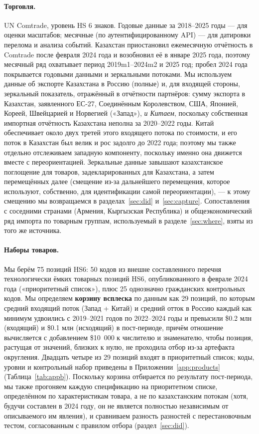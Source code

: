 \documentclass[12pt]{article}
\begin{document}
\paragraph{Торговля.} UN Comtrade, уровень HS 6 знаков. Годовые данные за 2018--2025 годы —
для оценки масштабов; месячные (по аутентифицированному API) — для датировки перелома и
анализа событий. Казахстан приостановил ежемесячную отчётность в Comtrade после февраля
2024 года и возобновил её в январе 2025 года, поэтому месячный ряд охватывает период
2019m1--2024m2 и 2025 год; пробел 2024 года покрывается годовыми данными и зеркальными
потоками. Мы используем данные об экспорте Казахстана в Россию (полные) и, для входящей
стороны, зеркальный показатель, отражённый в отчётности партнёров: сумму экспорта в
Казахстан, заявленного ЕС-27, Соединённым Королевством, США, Японией, Кореей, Швейцарией и
Норвегией («Запад»), \emph{и Китаем}, поскольку собственная импортная отчётность Казахстана
неполна за 2020--2022 годы. Китай обеспечивает около двух третей этого входящего потока по
стоимости, и его поток в Казахстан был велик и рос задолго до 2022 года; поэтому мы также
отдельно отслеживаем западную компоненту, поскольку именно она движется вместе с
переориентацией. Зеркальные данные завышают казахстанское поглощение для товаров,
задекларированных для Казахстана, а затем перемещённых далее (смещение из-за дальнейшего
перемещения, которое \citet{chupilkin2026roundabout} используют, собственно, для
идентификации самой переориентации), — к этому смещению мы возвращаемся в
разделах~\ref{sec:did} и~\ref{sec:capture}. Сопоставления с соседними странами (Армения,
Кыргызская Республика) и общеэкономический ряд импорта по товарным группам, используемый в
разделе~\ref{sec:where}, взяты из того же источника.

\paragraph{Наборы товаров.} Мы берём 75 позиций HS6: 50 кодов из внешне составленного
перечня технологически ёмких товарных позиций HS6, опубликованного в феврале 2024 года
(«приоритетный список»), плюс 25 однозначно гражданских контрольных кодов. Мы определяем
\textbf{корзину всплеска} по данным как 29 позиций, по которым средний входящий поток
(Запад + Китай) и средний отток в Россию каждый как минимум удвоились с 2019--2021 годов по
2022--2024 годы и превысили \$0.2 млн (входящий) и \$0.1 млн (исходящий) в пост-периоде,
причём отношение вычисляется с добавлением \$10~000 к числителю и знаменателю, чтобы
позиция, растущая от значений, близких к нулю, не проходила отбор из-за артефакта
округления. Двадцать четыре из 29 позиций входят в приоритетный список; коды, уровни и
контрольный набор приведены в Приложении~\ref{app:products} (Таблица~\ref{tab:appb}).
Поскольку корзина отбирается по результату пост-периода, мы также прогоняем каждую
спецификацию на приоритетном списке, определённом по характеристикам товара, а не по
казахстанским потокам (хотя, будучи составлен в 2024 году, он не является полностью
независимым от описываемого им явления), и сравниваем разность разностей с перестановочным
тестом, согласованным с правилом отбора (раздел~\ref{sec:did}).
\end{document}
